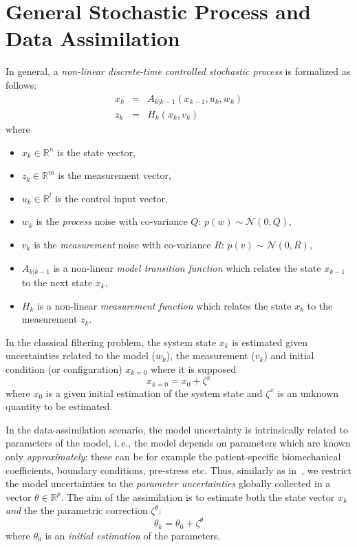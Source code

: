 \documentclass[paper=a4, fontsize=11pt]{article}
\def\ie{i.\,e.}
\begin{document}
\section{General Stochastic Process and Data Assimilation}
\label{s:formal}
In general, a \emph{non-linear discrete-time controlled stochastic process} is formalized as follows:
\begin{eqnarray}
x_k &=& A_{k|k-1}(x_{k-1}, u_{k}, w_{k}) \label{eq:model} \\
z_k &=& H_k(x_k, v_k) \label{eq:meas}
\end{eqnarray}
where
\begin{itemize}
	\item $x_k\in\mathbb{R}^n$ is the state vector,
	\item $z_k\in\mathbb{R}^m$ is the measurement vector,
	\item $u_k\in\mathbb{R}^l$ is the control input vector,
	\item $w_k$ is the \emph{process} noise with co-variance $Q$: $p(w)\sim\mathcal{N}(0,Q)$,
    \item $v_k$ is the \emph{measurement} noise with co-variance $R$: $p(v)\sim\mathcal{N}(0,R)$,
    \item $A_{k|k-1}$ is a non-linear \emph{model transition function} which relates the state $x_{k-1}$ to the next state $x_k$,
    \item $H_k$ is a non-linear \emph{measurement function} which relates the state $x_k$ to the measurement $z_k$.
\end{itemize}
In the classical filtering problem, the system state $x_k$ is estimated given uncertainties related to 
the model ($w_k$), the measurement ($v_k$) and initial condition (or configuration) $x_{k=0}$ where 
it is supposed 
\begin{equation}
x_{k=0} = x_0 + \zeta^x 
\label{eq:initUncent}
\end{equation} 
where $x_0$ is a given initial estimation of the system state and $\zeta^x$ is 
an unknown quantity to be estimated. 

In the data-assimilation scenario, the model uncertainty is intrinsically related to parameters of the model, 
\ie, the model depends on parameters which are known only \emph{approximately}: these can be for example 
the patient-specific biomechanical coefficients, boundary conditions, pre-stress etc. 
Thus, similarly as in~\cite{moireau2011reduced}, we restrict the model uncertainties to the \emph{parameter uncertainties}
globally collected in a vector $\theta\in\mathbb{R}^p$. The aim of the assimilation 
is to estimate both the state vector $x_k$ \emph{and} the the parametric correction $\zeta^\theta$:
\begin{equation}
\theta_k = \theta_0 + \zeta^\theta
\label{eq:param}
\end{equation}
where $\theta_0$ is an \emph{initial estimation} of the parameters. 
\end{document}
